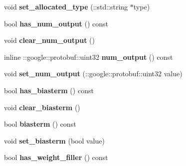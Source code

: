 \begin{DoxyCompactItemize}
void {\bfseries set\+\_\+allocated\+\_\+type} (\+::std\+::string $\ast$type)
\item 
\mbox{\label{classcaffe_1_1_v0_layer_parameter_aae456f24dd318c7f45ce44555ec7a9af}} 
bool {\bfseries has\+\_\+num\+\_\+output} () const
\item 
\mbox{\label{classcaffe_1_1_v0_layer_parameter_a5f98b9110a716431194c758fc385c5c0}} 
void {\bfseries clear\+\_\+num\+\_\+output} ()
\item 
\mbox{\label{classcaffe_1_1_v0_layer_parameter_aec6fd0cdb5dc8acbb31df024f690b348}} 
inline \+::google\+::protobuf\+::uint32 {\bfseries num\+\_\+output} () const
\item 
\mbox{\label{classcaffe_1_1_v0_layer_parameter_a6ff39f2f19bc51dbf9bf4a51805a104c}} 
void {\bfseries set\+\_\+num\+\_\+output} (\+::google\+::protobuf\+::uint32 value)
\item 
\mbox{\label{classcaffe_1_1_v0_layer_parameter_a8755206388bcc8282cc27b81c22ca4ed}} 
bool {\bfseries has\+\_\+biasterm} () const
\item 
\mbox{\label{classcaffe_1_1_v0_layer_parameter_ae17eb504f10cb254ffecb12476febfff}} 
void {\bfseries clear\+\_\+biasterm} ()
\item 
\mbox{\label{classcaffe_1_1_v0_layer_parameter_af71fef496e1a60cb64538c01abad85e8}} 
bool {\bfseries biasterm} () const
\item 
\mbox{\label{classcaffe_1_1_v0_layer_parameter_a502bceab1690c5c1c79f6937bdc8ad4b}} 
void {\bfseries set\+\_\+biasterm} (bool value)
\item 
\mbox{\label{classcaffe_1_1_v0_layer_parameter_a8ea00d416e5208f8674954ca24645034}} 
bool {\bfseries has\+\_\+weight\+\_\+filler} () const
\item 
\mbox{\label{classcaffe_1_1_v0_layer_parameter_a70b689cbd8049c4d2cd89a0199e9e92b}} 

\end{DoxyCompactItemize}
